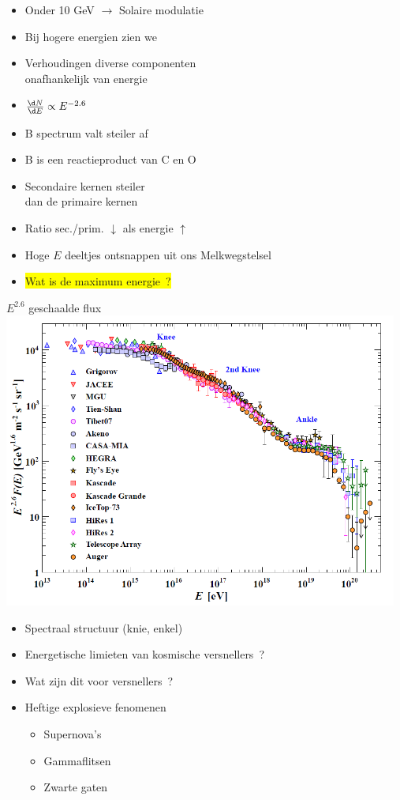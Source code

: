 \newpage

\begin{itemize}
\item[] Onder 10 GeV $\rightarrow$ Solaire modulatie
\item[] Bij hogere energien zien we
\item Verhoudingen diverse componenten\\
      onafhankelijk van energie
\item $\frac{\d N}{\d E} \propto E^{-2.6}$
\item B spectrum valt steiler af
\item[] B is een reactieproduct van C en O
\item[] Secondaire kernen steiler\\
        dan de primaire kernen
\item Ratio sec./prim. $\downarrow$ als energie $\uparrow$
\item[] Hoge $E$ deeltjes ontsnappen uit ons Melkwegstelsel
\item[] \colorbox{yellow}{Wat is de maximum energie~?}
\end{itemize}

\Tr
\vspace*{1.5cm}
\begin{center}
{\blue $E^{2.6}$ geschaalde flux}\\[5mm]
\includegraphics[keepaspectratio,width=13cm]{cr-all-scaled26}
\end{center}

\newpage

\vspace*{3cm}
\begin{itemize}
\item Spectraal structuur (knie, enkel)
\item[] Energetische limieten van kosmische versnellers~?
\item Wat zijn dit voor versnellers~?
\item[] Heftige explosieve fenomenen
\begin{itemize}
\item Supernova's
\item Gammaflitsen
\item Zwarte gaten
\end{itemize}
\end{itemize}

